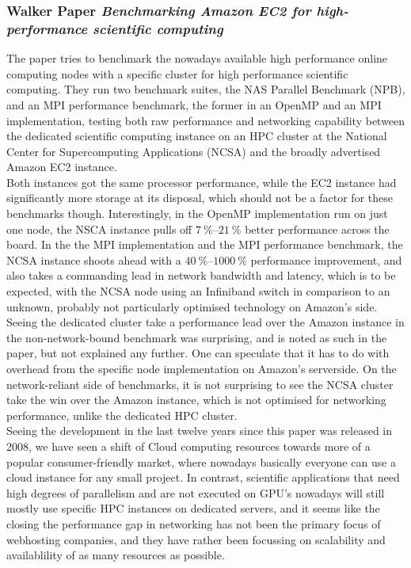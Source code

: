 \documentclass[]{scrartcl}
\begin{document}
\subsubsection{Walker Paper \textit{Benchmarking Amazon EC2 for high-performance scientific computing}} 
The paper tries to benchmark the nowadays available high performance online computing nodes with a specific cluster for high performance scientific computing. They run two benchmark suites, the NAS Parallel Benchmark (NPB), and an MPI performance benchmark, the former in an OpenMP and an MPI implementation, testing both raw performance and networking capability between the dedicated scientific computing instance on an HPC cluster at the National Center for Supercomputing Applications (NCSA) and the broadly advertised Amazon EC2 instance.
\\
Both instances got the same processor performance, while the EC2 instance had significantly more storage at its disposal, which should not be a factor for these benchmarks though. Interestingly, in the OpenMP implementation run on just one node, the NSCA instance pulls off $ \SIrange{7}{21}{\percent} $ better performance across the board. In the the MPI implementation and the MPI performance benchmark, the NCSA instance shoots ahead with a $ \SIrange{40}{1000}{\percent} $ performance improvement, and also takes a commanding lead in network bandwidth and latency, which is to be expected, with the NCSA node using an Infiniband switch in comparison to an unknown, probably not particularly optimised technology on Amazon's side.
\\
Seeing the dedicated cluster take a performance lead over the Amazon instance in the non-network-bound benchmark was surprising, and is noted as such in the paper, but not explained any further. One can speculate that it has to do with overhead from the specific node implementation on Amazon's serverside. On the network-reliant side of benchmarks, it is not surprising to see the NCSA cluster take the win over the Amazon instance, which is not optimised for networking performance, unlike the dedicated HPC cluster.
\\
Seeing the development in the last twelve years since this paper was released in 2008, we have seen a shift of Cloud computing resources towards more of a popular consumer-friendly market, where nowadays basically everyone can use a cloud instance for any small project. In contrast, scientific applications that need high degrees of parallelism and are not executed on GPU's nowadays will still mostly use specific HPC instances on dedicated servers, and it seems like the closing the performance gap in networking has not been the primary focus of webhosting companies, and they have rather been focussing on scalability and availablility of as many resources as possible.
\end{document}
